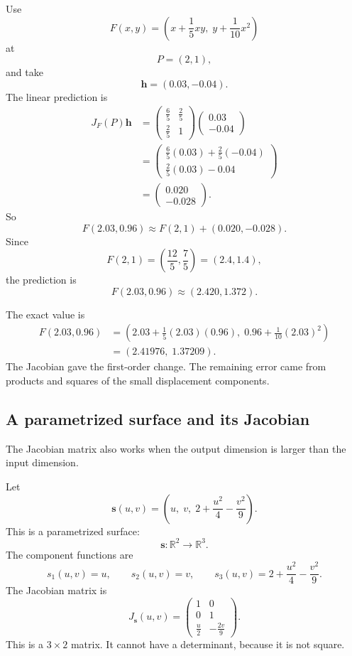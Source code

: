 \begin{example}
Use
\[
    F(x,y)=
    \left(
        x+\frac15xy,\;
        y+\frac1{10}x^2
    \right)
\]
at
\[
    P=(2,1),
\]
and take
\[
    \mathbf h=(0.03,-0.04).
\]
The linear prediction is
\[
\begin{aligned}
J_F(P)\mathbf h
&=
\begin{pmatrix}
\frac65 & \frac25\\[1mm]
\frac25 & 1
\end{pmatrix}
\begin{pmatrix}
0.03\\
-0.04
\end{pmatrix}  \\
&=
\begin{pmatrix}
\frac65(0.03)+\frac25(-0.04)\\[1mm]
\frac25(0.03)-0.04
\end{pmatrix}  \\
&=
\begin{pmatrix}
0.020\\
-0.028
\end{pmatrix}.
\end{aligned}
\]
So
\[
    F(2.03,0.96)
    \approx
    F(2,1)+(0.020,-0.028).
\]
Since
\[
    F(2,1)=\left(\frac{12}{5},\frac75\right)=(2.4,1.4),
\]
the prediction is
\[
    F(2.03,0.96)\approx(2.420,1.372).
\]

The exact value is
\[
\begin{aligned}
F(2.03,0.96)
&=
\left(
2.03+\frac15(2.03)(0.96),\;
0.96+\frac1{10}(2.03)^2
\right)\\
&=
(2.41976,\;1.37209).
\end{aligned}
\]
The Jacobian gave the first-order change.  The remaining error came from products and
squares of the small displacement components.
\end{example}

\subsection{A parametrized surface and its Jacobian}

The Jacobian matrix also works when the output dimension is larger than the input
dimension.

Let
\[
    \mathbf s(u,v)=
    \left(
        u,\;
        v,\;
        2+\frac{u^2}{4}-\frac{v^2}{9}
    \right).
\]
This is a parametrized surface:
\[
    \mathbf s:\mathbb R^2\to\mathbb R^3.
\]
The component functions are
\[
    s_1(u,v)=u,
    \qquad
    s_2(u,v)=v,
    \qquad
    s_3(u,v)=2+\frac{u^2}{4}-\frac{v^2}{9}.
\]
The Jacobian matrix is
\[
\boxed{
J_{\mathbf s}(u,v)
=
\begin{pmatrix}
1 & 0\\
0 & 1\\[1mm]
\frac{u}{2} & -\frac{2v}{9}
\end{pmatrix}.
}
\]
This is a \(3\times2\) matrix.  It cannot have a determinant, because it is not square.

